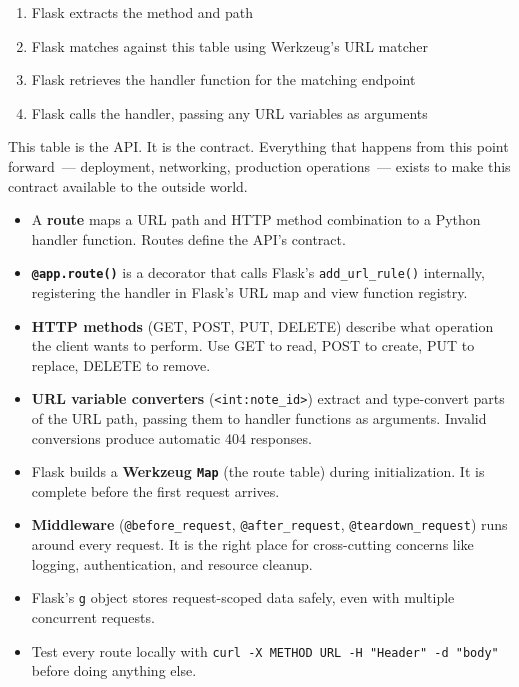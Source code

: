 \begin{enumerate}
\def\labelenumi{\arabic{enumi}.}
\tightlist
\item
  Flask extracts the method and path
\item
  Flask matches against this table using Werkzeug's URL matcher
\item
  Flask retrieves the handler function for the matching endpoint
\item
  Flask calls the handler, passing any URL variables as arguments
\end{enumerate}

\noindent{}This table is the API. It is the contract. Everything that happens from this point forward~--- deployment, networking, production operations~--- exists to make this contract available to the outside world.

\label{04-request-handling-paths:key-takeaways}
\begin{takeaways}

\begin{itemize}
\tightlist
\item
  A \textbf{route} maps a URL path and HTTP method combination to a Python handler function. Routes define the API's contract.
\item
  \textbf{\texttt{@app.route()}} is a decorator that calls Flask's \texttt{add\_url\_rule()} internally, registering the handler in Flask's URL map and view function registry.
\item
  \textbf{HTTP methods} (GET, POST, PUT, DELETE) describe what operation the client wants to perform. Use GET to read, POST to create, PUT to replace, DELETE to remove.
\item
  \textbf{URL variable converters} (\texttt{\textless{}int:note\_id\textgreater{}}) extract and type-convert parts of the URL path, passing them to handler functions as arguments. Invalid conversions produce automatic 404 responses.
\item
  Flask builds a \textbf{Werkzeug \texttt{Map}} (the route table) during initialization. It is complete before the first request arrives.
\item
  \textbf{Middleware} (\texttt{@before\_request}, \texttt{@after\_request}, \texttt{@teardown\_request}) runs around every request. It is the right place for cross-cutting concerns like logging, authentication, and resource cleanup.
\item
  Flask's \texttt{g} object stores request-scoped data safely, even with multiple concurrent requests.
\item
  Test every route locally with \texttt{curl\ -}\allowbreak{}\texttt{X\ METHOD\ URL\ -}\allowbreak{}\texttt{H\ "Header"\ -}\allowbreak{}\texttt{d\ "body"} before doing anything else.
\end{itemize}

\end{takeaways}


